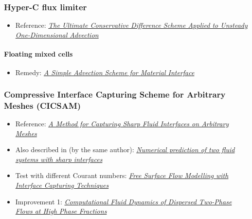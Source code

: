 \subsubsection{Hyper-C flux limiter}

\begin{itemize}
    \item Reference: \textit{\href{http://www.water.tkk.fi/wr/kurssit/Yhd-12.112/TVD1.pdf}{The Ultimate Conservative Difference Scheme Applied to Unsteady One-Dimensional Advection}}
\end{itemize}

\paragraph{Floating mixed cells}

\begin{itemize}
    \item Remedy: \textit{\href{https://e-reports-ext.llnl.gov/pdf/245038.pdf}{A Simple Advection Scheme for Material Interface}}
\end{itemize}

\subsubsection{Compressive Interface Capturing Scheme for Arbitrary Meshes (CICSAM)}

\begin{itemize}
    \item Reference: \textit{\href{http://ac.els-cdn.com/S0021999199962769/1-s2.0-S0021999199962769-main.pdf?_tid=85161b57da5f4401e55c9d07495e24ea&acdnat=1336167249_a59e4f578adbacf3bff69936c48cdd57}{A Method for Capturing Sharp Fluid Interfaces on Arbitrary Meshes}}
    \item Also described in (by the same author): \textit{\href{http://powerlab.fsb.hr/ped/kturbo/OpenFOAM/docs/OnnoUbbinkPhD.pdf}{Numerical prediction of two fluid systems with sharp interfaces}}
    \item Test with different Courant numbers: \textit{\href{http://www.marin.nl/upload_mm/8/2/c/1807524470_1999999096_2007-ECCOMAS_HoekstraVazAbeilBunnik.pdf}{Free Surface Flow Modelling with Interface Capturing Techniques}}
    \item Improvement 1: \textit{\href{http://powerlab.fsb.hr/ped/kturbo/openfoam/docs/HenrikRuschePhD2002.pdf}{Computational Fluid Dynamics of Dispersed Two-Phase Flows at High Phase Fractions}}
\end{itemize}

